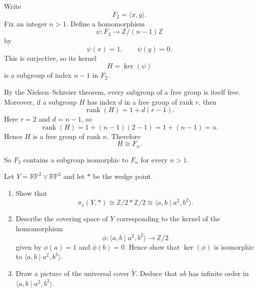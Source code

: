 \begin{solution}
Write
\[
F_2=\langle x,y\rangle.
\]
Fix an integer \(n>1\). Define a homomorphism
\[
\psi:F_2\longrightarrow \mathbb Z/(n-1)\mathbb Z
\]
by
\[
\psi(x)=1,\qquad \psi(y)=0.
\]
This is surjective, so its kernel
\[
H=\ker(\psi)
\]
is a subgroup of index \(n-1\) in \(F_2\).

By the Nielsen--Schreier theorem, every subgroup of a free group is itself free. Moreover, if a subgroup \(H\) has index \(d\) in a free group of rank \(r\), then
\[
\operatorname{rank}(H)=1+d(r-1).
\]
Here \(r=2\) and \(d=n-1\), so
\[
\operatorname{rank}(H)=1+(n-1)(2-1)=1+(n-1)=n.
\]
Hence \(H\) is a free group of rank \(n\). Therefore
\[
H\cong F_n.
\]

So \(F_2\) contains a subgroup isomorphic to \(F_n\) for every \(n>1\).

\par
\end{solution}

\begin{problem}
Let \(Y=\mathbb{RP}^2\vee \mathbb{RP}^2\) and let \(*\) be the wedge point.

\begin{enumerate}
	\item[(i)] Show that
	\[
	\pi_1(Y,*)\cong \mathbb Z/2 * \mathbb Z/2 \cong \langle a,b \mid a^2,b^2\rangle.
	\]

	\item[(ii)] Describe the covering space of \(Y\) corresponding to the kernel of the homomorphism
	\[
	\phi:\langle a,b \mid a^2,b^2\rangle \to \mathbb Z/2
	\]
	given by \(\phi(a)=1\) and \(\phi(b)=0\). Hence show that \(\ker(\phi)\) is isomorphic to \(\langle a,b \mid a^2,b^2\rangle\).

	\item[(iii)] Draw a picture of the universal cover \(\widetilde{Y}\). Deduce that \(ab\) has infinite order in \(\langle a,b \mid a^2,b^2\rangle\).
\end{enumerate}

\par
\end{problem}


